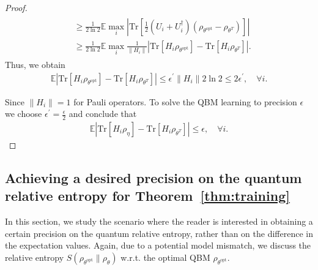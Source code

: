 \documentclass[
    aps,
    prx,
    floatfix,
    nofootinbib,
    onecolumn
]{revtex4-2}
\newcommand{\Tr}{\mathrm{Tr}}
\begin{document}
\begin{proof}
\begin{align}
\begin{split}
    &\geq \frac{1}{2 \ln 2} \mathbb{E} \max_i \left| \Tr[ \frac{1}{2}(U_i + U_i^\dag)(\rho_{\theta^\mathrm{opt}} - \rho_{\theta^T}) ] \right| \\
    & \geq \frac{1}{2 \ln 2} \mathbb{E} \max_i \frac{1}{\| H_i\|} | \Tr[ H_i \rho_{\theta^\mathrm{opt}}]  - \Tr[ H_i \rho_{\theta^T} ] | .
\end{split}
\end{align}
Thus, we obtain
\begin{align}
\mathbb{E} | \Tr[ H_i \rho_{\theta^\mathrm{opt}}]  - \Tr[ H_i \rho_{\theta^T} ] | \leq \epsilon^\prime  \| H_i \| 2 \ln 2 \leq 2 \epsilon^\prime , \quad \forall i . 
\end{align}

Since $\| H_i \| = 1$ for Pauli operators. To solve the QBM learning to precision $\epsilon$ we choose $\epsilon^\prime = \frac{ \epsilon}{2}$ and conclude that
\begin{align}
\mathbb{E} | \Tr[ H_i \rho_\eta]  - \Tr[ H_i \rho_{\theta^T} ] | \leq \epsilon , \quad \forall i . 
\end{align}
\end{proof}

\subsection{Achieving a desired precision on the quantum relative entropy for Theorem~\ref{thm:training}}
\label{app:relentprec}

In this section, we study the scenario where the reader is interested in obtaining a certain precision on the quantum relative entropy, rather than on the difference in the expectation values. Again, due to a potential model mismatch, we discuss the relative entropy $S(\rho_{\theta^\mathrm{opt}} \| \rho_{\theta})$ w.r.t. the optimal QBM $\rho_{\theta^\mathrm{opt}}$.
\end{document}
